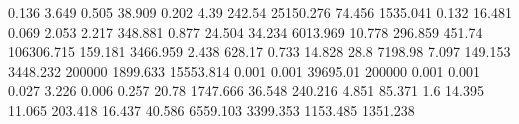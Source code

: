 0.136      3.649      %
0.505      38.909     %
0.202      4.39       %
242.54     25150.276  %
74.456     1535.041   %
0.132      16.481     %
0.069      2.053      %
2.217      348.881    %
0.877      24.504     %
34.234     6013.969   %
10.778     296.859    %
451.74     106306.715 %
159.181    3466.959   %
2.438      628.17     %
0.733      14.828     %
28.8       7198.98    %
7.097      149.153    %
3448.232   200000     %
1899.633   15553.814  %
0.001      0.001      %
39695.01   200000     %
0.001      0.001      %
0.027      3.226      %
0.006      0.257      %
20.78      1747.666   %
36.548     240.216    %
4.851      85.371     %
1.6        14.395     %
11.065     203.418    %
16.437     40.586     %
6559.103   3399.353   %
1153.485   1351.238   %
